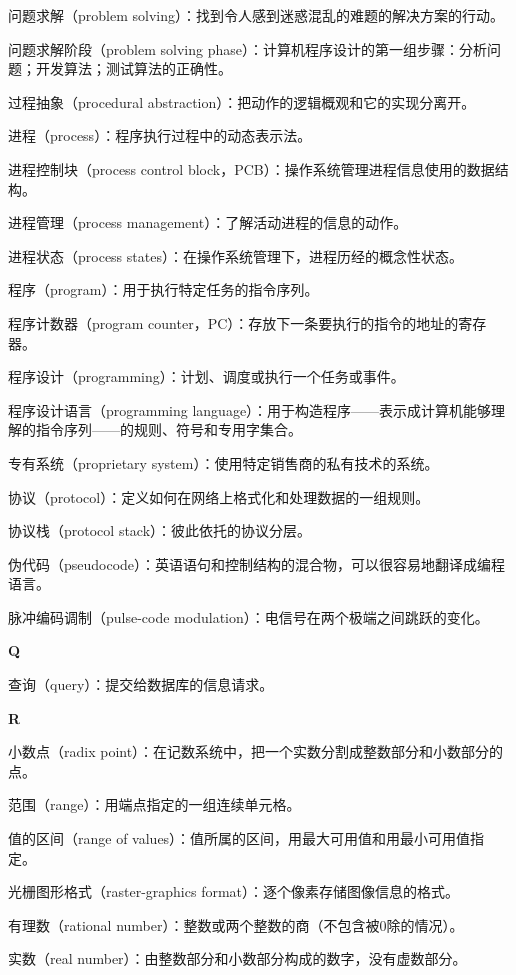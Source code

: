 问题求解（problem solving）：找到令人感到迷惑混乱的难题的解决方案的行动。

问题求解阶段（problem solving phase）：计算机程序设计的第一组步骤：分析问题；开发算法；测试算法的正确性。

过程抽象（procedural abstraction）：把动作的逻辑概观和它的实现分离开。

进程（process）：程序执行过程中的动态表示法。

进程控制块（process control block，PCB）：操作系统管理进程信息使用的数据结构。

进程管理（process management）：了解活动进程的信息的动作。

进程状态（process states）：在操作系统管理下，进程历经的概念性状态。

程序（program）：用于执行特定任务的指令序列。

程序计数器（program counter，PC）：存放下一条要执行的指令的地址的寄存器。

程序设计（programming）：计划、调度或执行一个任务或事件。

程序设计语言（programming language）：用于构造程序——表示成计算机能够理解的指令序列——的规则、符号和专用字集合。

专有系统（proprietary system）：使用特定销售商的私有技术的系统。

协议（protocol）：定义如何在网络上格式化和处理数据的一组规则。

协议栈（protocol stack）：彼此依托的协议分层。

伪代码（pseudocode）：英语语句和控制结构的混合物，可以很容易地翻译成编程语言。

脉冲编码调制（pulse-code modulation）：电信号在两个极端之间跳跃的变化。

\textbf{Q}

查询（query）：提交给数据库的信息请求。

\textbf{R}

小数点（radix point）：在记数系统中，把一个实数分割成整数部分和小数部分的点。

范围（range）：用端点指定的一组连续单元格。

值的区间（range of values）：值所属的区间，用最大可用值和用最小可用值指定。

光栅图形格式（raster-graphics format）：逐个像素存储图像信息的格式。

有理数（rational number）：整数或两个整数的商（不包含被0除的情况）。

实数（real number）：由整数部分和小数部分构成的数字，没有虚数部分。

